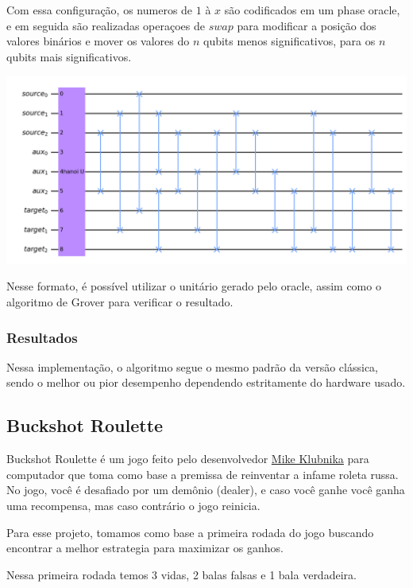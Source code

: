\documentclass{article}
\begin{document}
Com essa configuração, os numeros de $1$ à $x$ são codificados em um phase oracle, e em seguida são realizadas operaçoes de $swap$ para modificar a posição dos valores binários e mover os valores do $n$ qubits menos significativos, para os $n$ qubits mais significativos.

\begin{center}
	\includegraphics[scale=0.2]{hanoi_4_discs.png}
	\label{fig:hanoi}
\end{center}

Nesse formato, é possível utilizar o unitário gerado pelo oracle, assim como o algoritmo de Grover para verificar o resultado.

\subsubsection{Resultados}

Nessa implementação, o algoritmo segue o mesmo padrão da versão clássica, sendo o melhor ou pior desempenho dependendo estritamente do hardware usado.


\subsection{Buckshot Roulette}

Buckshot Roulette é um jogo feito pelo desenvolvedor \href{https://mikeklubnika.itch.io/}{Mike Klubnika} para computador que toma como base a premissa de reinventar a infame roleta russa. No jogo, você é desafiado por um demônio (dealer), e caso você ganhe você ganha uma recompensa, mas caso contrário o jogo reinicia.

Para esse projeto, tomamos como base a primeira rodada do jogo buscando encontrar a melhor estrategia para maximizar os ganhos.

Nessa primeira rodada temos 3 vidas, 2 balas falsas e 1 bala verdadeira.
\end{document}
